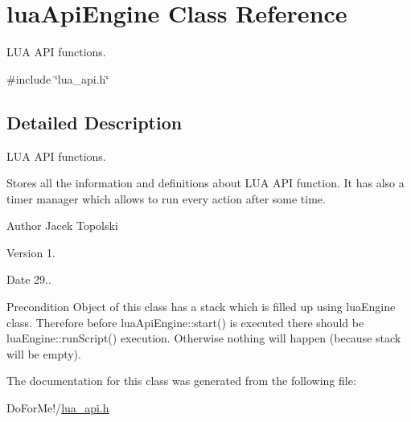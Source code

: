 \hypertarget{classlua_api_engine}{\section{lua\-Api\-Engine Class Reference}
\label{classlua_api_engine}
}


L\-U\-A A\-P\-I functions.  




{\ttfamily \#include \char`\"{}lua\-\_\-api.\-h\char`\"{}}



\subsection{Detailed Description}
L\-U\-A A\-P\-I functions. 

Stores all the information and definitions about L\-U\-A A\-P\-I function. It has also a timer manager which allows to run every action after some time. \begin{DoxyAuthor}{Author}
Jacek Topolski 
\end{DoxyAuthor}
\begin{DoxyVersion}{Version}
1. 
\end{DoxyVersion}
\begin{DoxyDate}{Date}
29.. 
\end{DoxyDate}
\begin{DoxyPrecond}{Precondition}
Object of this class has a stack which is filled up using lua\-Engine class. Therefore before lua\-Api\-Engine\-::start() is executed there should be lua\-Engine\-::run\-Script() execution. Otherwise nothing will happen (because stack will be empty). 
\end{DoxyPrecond}


The documentation for this class was generated from the following file\-:\begin{DoxyCompactItemize}
\item 
Do\-For\-Me!/\hyperlink{lua__api_8h}{lua\-\_\-api.\-h}\end{DoxyCompactItemize}
